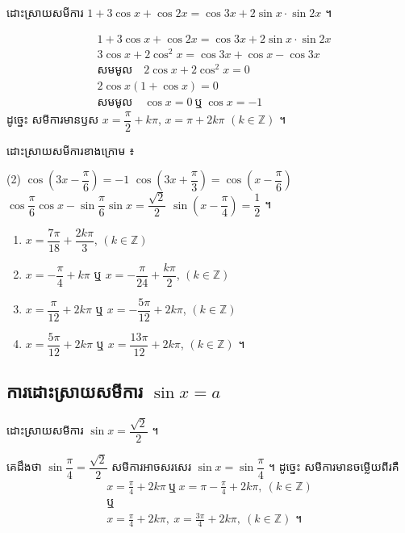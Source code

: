 \begin{example}[លំហាត់គំរូ ២]
ដោះស្រាយសមីការ $1 + 3\cos x + \cos 2x = \cos 3x + 2\sin x \cdot \sin 2x$ ។
\end{example}
\ans
\[
\begin{aligned}
&1 + 3\cos x + \cos 2x = \cos 3x + 2\sin x \cdot \sin 2x\\
&3\cos x + 2\cos^2 x = \cos 3x + \cos x - \cos 3x\\
&\text{សមមូល} \quad 2\cos x + 2\cos^2 x = 0\\
&2\cos x(1 + \cos x) = 0\\
&\text{សមមូល} \quad \cos x = 0 \ \text{ឬ} \ \cos x = -1
\end{aligned}
\]
ដូច្នេះ សមីការមានឫស $x = \dfrac{\pi}{2} + k\pi$, $x = \pi + 2k\pi$ $(k \in \mathbb{Z})$ ។

\begin{pro}
ដោះស្រាយសមីការខាងក្រោម ៖
\begin{tasks}(2)
  \task $\cos\left(3x - \dfrac{\pi}{6}\right) = -1$
  \task $\cos\left(3x + \dfrac{\pi}{3}\right) = \cos\left(x - \dfrac{\pi}{6}\right)$
  \task $\cos\dfrac{\pi}{6}\cos x - \sin\dfrac{\pi}{6}\sin x = \dfrac{\sqrt{2}}{2}$
  \task $\sin\left(x - \dfrac{\pi}{4}\right) = \dfrac{1}{2}$ ។
\end{tasks}
\ans
\begin{enumerate}[a]
  \item $x = \dfrac{7\pi}{18} + \dfrac{2k\pi}{3}$, $(k \in \mathbb{Z})$
  \item $x = -\dfrac{\pi}{4} + k\pi$ ឬ $x = -\dfrac{\pi}{24} + \dfrac{k\pi}{2}$, $(k \in \mathbb{Z})$
  \item $x = \dfrac{\pi}{12} + 2k\pi$ ឬ $x = -\dfrac{5\pi}{12} + 2k\pi$, $(k \in \mathbb{Z})$
  \item $x = \dfrac{5\pi}{12} + 2k\pi$ ឬ $x = \dfrac{13\pi}{12} + 2k\pi$, $(k \in \mathbb{Z})$ ។
\end{enumerate}
\end{pro}

\subsection{ការដោះស្រាយសមីការ \texorpdfstring{$\sin x = a$}{sin x = a}}

\begin{example}[ឧទាហរណ៍ ១]
ដោះស្រាយសមីការ $\sin x = \dfrac{\sqrt{2}}{2}$ ។

គេដឹងថា $\sin\dfrac{\pi}{4} = \dfrac{\sqrt{2}}{2}$ សមីការអាចសរសេរ $\sin x = \sin\dfrac{\pi}{4}$ ។ ដូច្នេះ សមីការមានចម្លើយពីរគឺ
\[
\begin{gathered}
x = \frac{\pi}{4} + 2k\pi \ \text{ឬ} \ x = \pi - \frac{\pi}{4} + 2k\pi, \ (k \in \mathbb{Z})\\
\text{ឬ}\\
x = \frac{\pi}{4} + 2k\pi, \ x = \frac{3\pi}{4} + 2k\pi, \ (k \in \mathbb{Z}) \text{ ។}
\end{gathered}
\]
\end{example}

